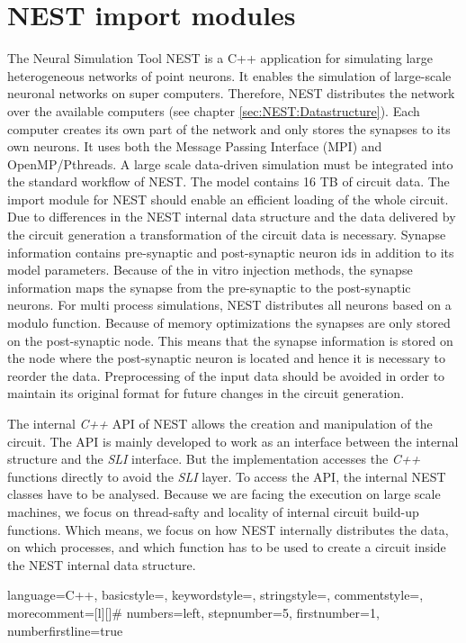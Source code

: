 \section{NEST import modules}
The Neural Simulation Tool NEST \cite{gewaltig2007nest} is a C++ application for simulating large heterogeneous networks of point neurons. It enables the simulation of large-scale neuronal networks on super computers.
Therefore, NEST distributes the network over the available computers (see chapter \ref{sec:NEST:Datastructure}).
Each computer creates its own part of the network and only stores the synapses to its own neurons.
It uses both the Message Passing Interface (MPI) and OpenMP/Pthreads.
A large scale data-driven simulation must be integrated into the standard
workflow of NEST.
The model contains 16 TB of circuit data.
The import module for NEST should enable an efficient loading of the whole circuit.
Due to differences in the NEST internal data structure and the data delivered by the
circuit generation a transformation of the circuit data is necessary.
Synapse information contains pre-synaptic and post-synaptic
neuron ids in addition to its model parameters.
Because of the in vitro injection
methods, the synapse information maps the synapse from the pre-synaptic to the
post-synaptic neurons. For multi process simulations, NEST distributes all neurons
based on a modulo function.
Because of memory optimizations
the synapses are only stored on the post-synaptic node. This means that the
synapse information is stored on the node where the post-synaptic neuron
is located and hence it is necessary to reorder the data.
Preprocessing of the
input data should be avoided in order to maintain its original format for future changes in the circuit generation.

The internal \emph{C++} API of NEST allows the creation and manipulation of the circuit.
The API is mainly developed to work as an interface between the internal structure
and the \emph{SLI} interface. But the implementation accesses the \emph{C++} functions directly
to avoid the \emph{SLI} layer. To access the API, the internal NEST classes
have to be analysed. Because we are facing the execution on large scale machines,
we focus on thread-safty and locality of internal circuit build-up functions.
Which means, we focus on how NEST internally distributes the data, on which processes, and which
function has to be used to create a circuit inside the NEST internal data structure.


 {language=C++,
                basicstyle=\small\ttfamily,
                keywordstyle=\color{blue}\ttfamily,
                stringstyle=\color{red}\ttfamily,
                commentstyle=\color{green}\ttfamily,
                morecomment=[l][\color{magenta}]{\#}
                numbers=left,
  				stepnumber=5,    
  				firstnumber=1,
 				numberfirstline=true
}


